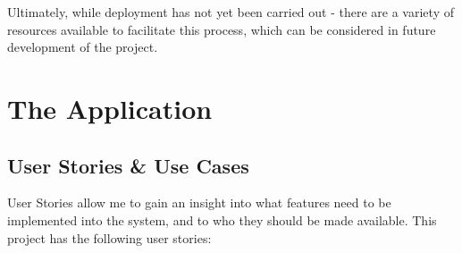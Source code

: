 \documentclass[]{final_report}
\begin{document}
Ultimately, while deployment has not yet been carried out - there are a variety of resources available to facilitate this process, which can be considered in future development of the project.

\chapter{The Application}
\section{User Stories \& Use Cases}

User Stories allow me to gain an insight into what features need to be implemented into the system, and to who they should be made available. This project has the following user stories:
\end{document}
